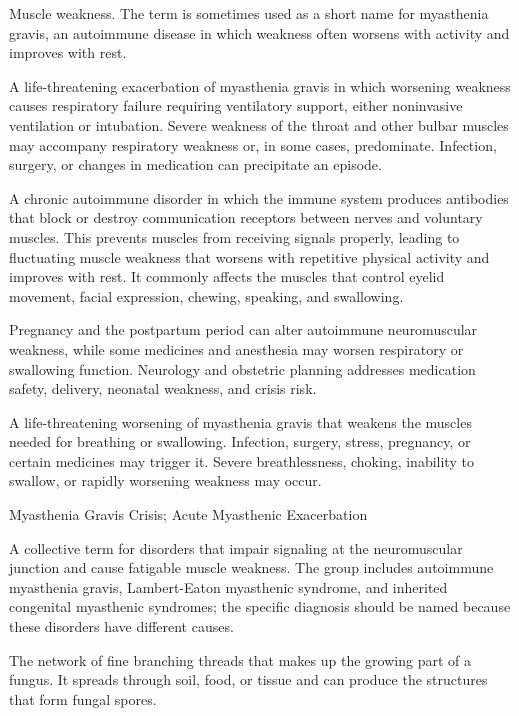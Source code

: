  Muscle weakness. The term is sometimes used as a short name for myasthenia gravis, an autoimmune disease in which weakness often worsens with activity and improves with rest.

 A life-threatening exacerbation of myasthenia gravis in which worsening weakness causes respiratory failure requiring ventilatory support, either noninvasive ventilation or intubation. Severe weakness of the throat and other bulbar muscles may accompany respiratory weakness or, in some cases, predominate. Infection, surgery, or changes in medication can precipitate an episode.

 A chronic autoimmune disorder in which the immune system produces antibodies that block or destroy communication receptors between nerves and voluntary muscles. This prevents muscles from receiving signals properly, leading to fluctuating muscle weakness that worsens with repetitive physical activity and improves with rest. It commonly affects the muscles that control eyelid movement, facial expression, chewing, speaking, and swallowing.

 Pregnancy and the postpartum period can alter autoimmune neuromuscular weakness, while some medicines and anesthesia may worsen respiratory or swallowing function. Neurology and obstetric planning addresses medication safety, delivery, neonatal weakness, and crisis risk.

 A life-threatening worsening of myasthenia gravis that weakens the muscles needed for breathing or swallowing. Infection, surgery, stress, pregnancy, or certain medicines may trigger it. Severe breathlessness, choking, inability to swallow, or rapidly worsening weakness may occur.

\synonyms
Myasthenia Gravis Crisis; Acute Myasthenic Exacerbation

 A collective term for disorders that impair signaling at the neuromuscular junction and cause fatigable muscle weakness. The group includes autoimmune myasthenia gravis, Lambert-Eaton myasthenic syndrome, and inherited congenital myasthenic syndromes; the specific diagnosis should be named because these disorders have different causes.

 The network of fine branching threads that makes up the growing part of a fungus. It spreads through soil, food, or tissue and can produce the structures that form fungal spores.

